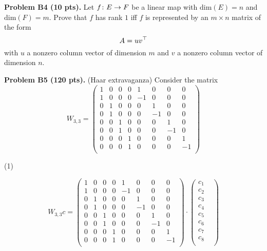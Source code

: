 \documentclass[12pt]{article}
\begin{document}
\vspace {0.25cm}\noindent
{\bf Problem B4 (10 pts).}
Let $f\colon E\rightarrow F$ be a linear map 
with $\mathrm{dim}(E) = n$ and $\mathrm{dim}(F)  = m$.
Prove that $f$ has rank $1$ iff $f$ is represented by an
$m\times n$ matrix of the form
\[
A = uv^{\top}
\]
with $u$ a nonzero column vector of dimension $m$ and $v$ a 
nonzero column vector  of dimension $n$.



\vspace {0.25cm}\noindent
{\bf Problem B5 (120 pts).} (Haar extravaganza)
Consider the matrix
\[
W_{3, 3} =
\begin{pmatrix}
1  &  0  &  0 & 0 & 1   &  0   & 0    & 0  \\
1  &  0  &  0 & 0 & -1 &  0   & 0    & 0  \\
0   &  1  &  0 & 0 &  0  & 1   & 0    & 0  \\
0   &  1  &  0 & 0 &  0  & -1 & 0    & 0  \\
0   &  0  &  1 & 0 &  0  &  0  & 1    & 0  \\
0   &  0  &  1 & 0 &  0  &  0  & -1  & 0  \\
0   &  0  &  0 & 1 &  0  &  0  & 0    & 1  \\
0   &  0  &  0 & 1 &  0  &  0  & 0    & -1  \\
\end{pmatrix}
\]

\medskip
(1)

\[
W_{3, 3} c =
\begin{pmatrix}
1  &  0  &  0 & 0 & 1   &  0   & 0    & 0  \\
1  &  0  &  0 & 0 & -1 &  0   & 0    & 0  \\
0   &  1  &  0 & 0 &  0  & 1   & 0    & 0  \\
0   &  1  &  0 & 0 &  0  & -1 & 0    & 0  \\
0   &  0  &  1 & 0 &  0  &  0  & 1    & 0  \\
0   &  0  &  1 & 0 &  0  &  0  & -1  & 0  \\
0   &  0  &  0 & 1 &  0  &  0  & 0    & 1  \\
0   &  0  &  0 & 1 &  0  &  0  & 0    & -1  \\
\end{pmatrix}
\cdot
\begin{pmatrix}
c_1 & \\
c_2 & \\
c_3 & \\
c_4 & \\
c_5 & \\
c_6 & \\
c_7 & \\
c_8 \\
\end{pmatrix}
\]
\end{document}
